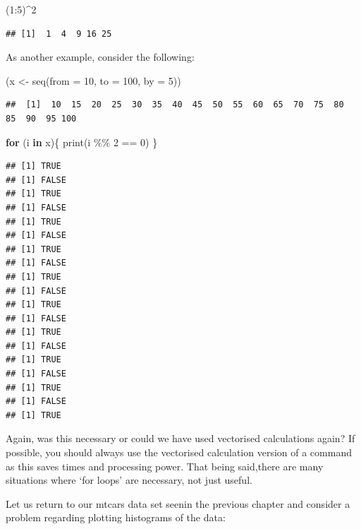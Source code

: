 \documentclass[
]{book}
\newenvironment{Shaded}{\begin{snugshade}}{\end{snugshade}}
\newcommand{\AttributeTok}[1]{\textcolor[rgb]{0.77,0.63,0.00}{#1}}
\newcommand{\ControlFlowTok}[1]{\textcolor[rgb]{0.13,0.29,0.53}{\textbf{#1}}}
\newcommand{\DecValTok}[1]{\textcolor[rgb]{0.00,0.00,0.81}{#1}}
\newcommand{\FunctionTok}[1]{\textcolor[rgb]{0.00,0.00,0.00}{#1}}
\newcommand{\NormalTok}[1]{#1}
\newcommand{\OtherTok}[1]{\textcolor[rgb]{0.56,0.35,0.01}{#1}}
\newcommand{\SpecialCharTok}[1]{\textcolor[rgb]{0.00,0.00,0.00}{#1}}
\theoremstyle{definition}
\theoremstyle{definition}
\theoremstyle{definition}
\theoremstyle{definition}
\theoremstyle{remark}
\begin{document}
\begin{Shaded}
\begin{Highlighting}[]
\NormalTok{(}\DecValTok{1}\SpecialCharTok{:}\DecValTok{5}\NormalTok{)}\SpecialCharTok{\^{}}\DecValTok{2}
\end{Highlighting}
\end{Shaded}

\begin{verbatim}
## [1]  1  4  9 16 25
\end{verbatim}

As another example, consider the following:

\begin{Shaded}
\begin{Highlighting}[]
\NormalTok{(x }\OtherTok{\textless{}{-}} \FunctionTok{seq}\NormalTok{(}\AttributeTok{from =} \DecValTok{10}\NormalTok{, }\AttributeTok{to =} \DecValTok{100}\NormalTok{, }\AttributeTok{by =} \DecValTok{5}\NormalTok{))}
\end{Highlighting}
\end{Shaded}

\begin{verbatim}
##  [1]  10  15  20  25  30  35  40  45  50  55  60  65  70  75  80  85  90  95 100
\end{verbatim}

\begin{Shaded}
\begin{Highlighting}[]
\ControlFlowTok{for}\NormalTok{ (i }\ControlFlowTok{in}\NormalTok{ x)\{}
  \FunctionTok{print}\NormalTok{(i }\SpecialCharTok{\%\%} \DecValTok{2} \SpecialCharTok{==} \DecValTok{0}\NormalTok{)}
\NormalTok{\}}
\end{Highlighting}
\end{Shaded}

\begin{verbatim}
## [1] TRUE
## [1] FALSE
## [1] TRUE
## [1] FALSE
## [1] TRUE
## [1] FALSE
## [1] TRUE
## [1] FALSE
## [1] TRUE
## [1] FALSE
## [1] TRUE
## [1] FALSE
## [1] TRUE
## [1] FALSE
## [1] TRUE
## [1] FALSE
## [1] TRUE
## [1] FALSE
## [1] TRUE
\end{verbatim}

Again, was this necessary or could we have used vectorised calculations again? If possible, you should always use the vectorised calculation version of a command as this saves times and processing power. That being said,there are many situations where `for loops' are necessary, not just useful.

Let us return to our mtcars data set seenin the previous chapter and consider a problem regarding plotting histograms of the data:
\end{document}
